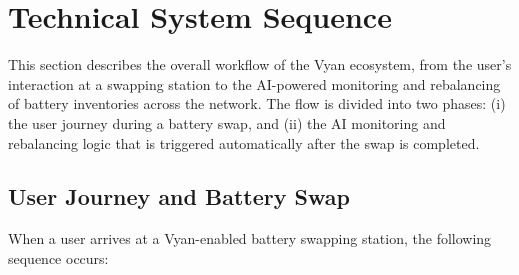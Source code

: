 \documentclass[12pt,a4paper]{article}
\begin{document}
\section{Technical System Sequence}

This section describes the overall workflow of the Vyan ecosystem, from the user's interaction at a swapping station to the AI-powered monitoring and rebalancing of battery inventories across the network. The flow is divided into two phases: (i) the user journey during a battery swap, and (ii) the AI monitoring and rebalancing logic that is triggered automatically after the swap is completed.

\subsection{User Journey and Battery Swap}

When a user arrives at a Vyan-enabled battery swapping station, the following sequence occurs:
\end{document}
